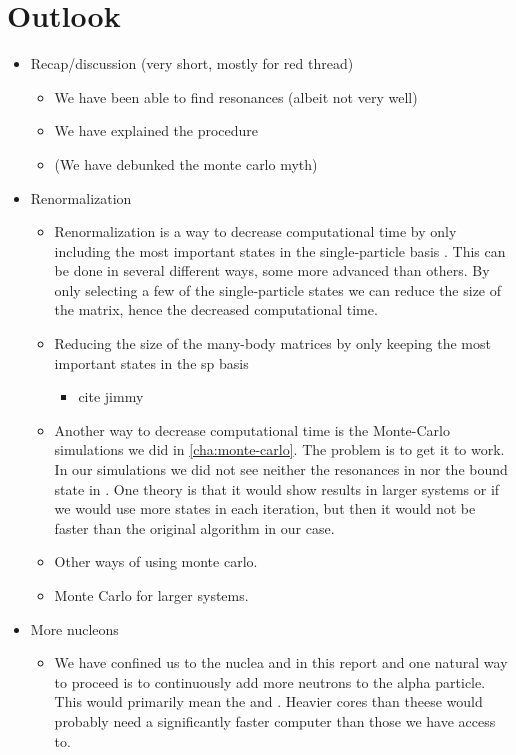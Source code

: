 \documentclass[../main/report.tex]{subfiles}
\begin{document}
\chapter{Outlook}
\label{cha:outlook}

\begin{itemize}
  \item Recap/discussion (very short, mostly for red thread)
  \begin{itemize}
    \item We have been able to find resonances (albeit not very well)
    \item We have explained the procedure
    \item (We have debunked the monte carlo myth)
  \end{itemize}
  \item Renormalization
  \begin{itemize}
    \item Renormalization is a way to decrease computational time by only including the most important states in the single-particle basis \cite{jimmy}. This can be done in several different ways, some more advanced than others. By only selecting a few of the single-particle states we can reduce the size of the matrix, hence the decreased computational time.
    \item Reducing the size of the many-body matrices by only keeping the most important states in the sp basis
    \begin{itemize}
      \item cite jimmy
    \end{itemize}
    \item Another way to decrease computational time is the Monte-Carlo simulations we did in \cref{cha:monte-carlo}. The problem is to get it to work. In our simulations we did not see neither the resonances in  nor the bound state in . One theory is that it would show results in larger systems or if we would use more states in each iteration, but then it would not be faster than the original algorithm in our case.
    \item Other ways of using monte carlo.
    \item Monte Carlo for larger systems.
  \end{itemize}

  \item More nucleons
  \begin{itemize}
    \item We have confined us to the nuclea  and  in this report and one natural way to proceed is to continuously add more neutrons to the alpha particle. This would primarily mean the  and . Heavier cores than theese would probably need a significantly faster computer than those we have access to.


\end{itemize}
\end{itemize}
\end{document}
